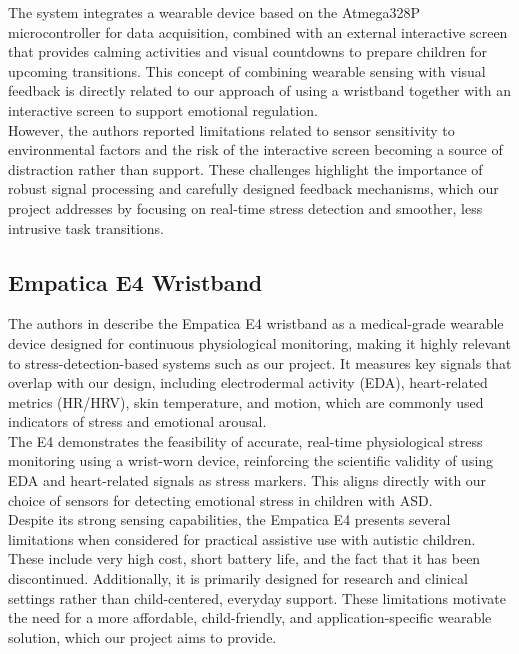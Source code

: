 \documentclass[a4paper,12pt]{report}
\begin{document}
The system integrates a wearable device based on the Atmega328P microcontroller for data acquisition, combined with an external interactive screen that provides calming activities and visual countdowns to prepare children for upcoming transitions. This concept of combining wearable sensing with visual feedback is directly related to our approach of using a wristband together with an interactive screen to support emotional regulation.\\[0.01cm]

However, the authors reported limitations related to sensor sensitivity to environmental factors and the risk of the interactive screen becoming a source of distraction rather than support. These challenges highlight the importance of robust signal processing and carefully designed feedback mechanisms, which our project addresses by focusing on real-time stress detection and smoother, less intrusive task transitions.
\subsection{Empatica E4 Wristband}
The authors in \cite{empatica_EmbracePlus} describe the Empatica E4 wristband as a medical-grade wearable device designed for continuous physiological monitoring, making it highly relevant to stress-detection-based systems such as our project. It measures key signals that overlap with our design, including electrodermal activity (EDA), heart-related metrics (HR/HRV), skin temperature, and motion, which are commonly used indicators of stress and emotional arousal.\\[0.01cm]

The E4 demonstrates the feasibility of accurate, real-time physiological stress monitoring using a wrist-worn device, reinforcing the scientific validity of using EDA and heart-related signals as stress markers. This aligns directly with our choice of sensors for detecting emotional stress in children with ASD. \\[0.01cm]

Despite its strong sensing capabilities, the Empatica E4 presents several limitations when considered for practical assistive use with autistic children. These include very high cost, short battery life, and the fact that it has been discontinued. Additionally, it is primarily designed for research and clinical settings rather than child-centered, everyday support. These limitations motivate the need for a more affordable, child-friendly, and application-specific wearable solution, which our project aims to provide.
\end{document}
